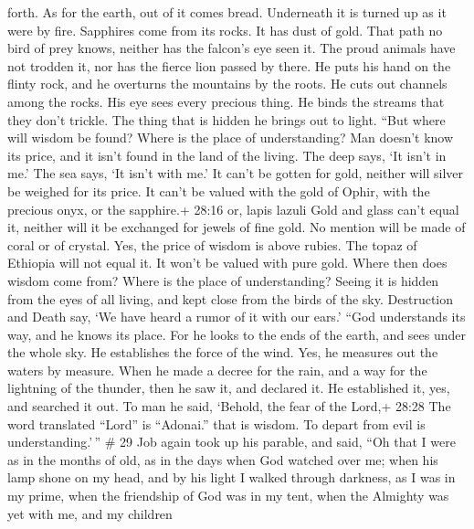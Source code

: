 forth.  As for the earth, out of it comes bread. Underneath
it is turned up as it were by fire.  Sapphires come from its
rocks. It has dust of gold.  That path no bird of prey
knows, neither has the falcon's eye seen it.  The proud
animals have not trodden it, nor has the fierce lion passed by there.
 He puts his hand on the flinty rock, and he overturns the
mountains by the roots.  He cuts out channels among the
rocks. His eye sees every precious thing.  He binds the
streams that they don't trickle. The thing that is hidden he brings out
to light.  ``But where will wisdom be found? Where is the
place of understanding?  Man doesn't know its price, and it
isn't found in the land of the living.  The deep says, `It
isn't in me.' The sea says, `It isn't with me.'  It can't
be gotten for gold, neither will silver be weighed for its price.
 It can't be valued with the gold of Ophir, with the
precious onyx, or the sapphire.+ 28:16 or, lapis lazuli 
Gold and glass can't equal it, neither will it be exchanged for jewels
of fine gold.  No mention will be made of coral or of
crystal. Yes, the price of wisdom is above rubies.  The
topaz of Ethiopia will not equal it. It won't be valued with pure gold.
 Where then does wisdom come from? Where is the place of
understanding?  Seeing it is hidden from the eyes of all
living, and kept close from the birds of the sky. 
Destruction and Death say, `We have heard a rumor of it with our ears.'
 ``God understands its way, and he knows its place.
 For he looks to the ends of the earth, and sees under the
whole sky.  He establishes the force of the wind. Yes, he
measures out the waters by measure.  When he made a decree
for the rain, and a way for the lightning of the thunder, 
then he saw it, and declared it. He established it, yes, and searched it
out.  To man he said, `Behold, the fear of the Lord,+ 28:28
The word translated ``Lord'' is ``Adonai.'' that is wisdom. To depart
from evil is understanding.'\,'' \# 29  Job again took up
his parable, and said,  ``Oh that I were as in the months of
old, as in the days when God watched over me;  when his lamp
shone on my head, and by his light I walked through darkness,
 as I was in my prime, when the friendship of God was in my
tent,  when the Almighty was yet with me, and my children
